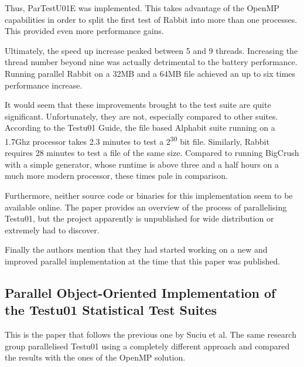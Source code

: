 Thus, ParTestU01E was implemented. This takes advantage of the OpenMP capabilities in order to split the first test of Rabbit into more than one processes. This provided even more performance gains.

Ultimately, the speed up increase peaked between 5 and 9 threads. Increasing the thread number beyond nine was actually detrimental to the battery performance. Running parallel Rabbit on a 32MB and a 64MB file achieved an up to six times performance increase.

It would seem that these improvements brought to the test suite are quite significant. Unfortunately, they are not, especially compared to other suites. According to the Testu01 Guide, the file based Alphabit suite running on a 1.7Ghz processor takes 2.3 minutes to test a 2\textsuperscript{30} bit file. Similarly, Rabbit requires 28 minutes to test a file of the same size. Compared to running BigCrush with a simple generator, whose runtime is above three and a half hours on a much more modern processor, these times pale in comparison.

Furthermore, neither source code or binaries for this implementation seem to be available online. The paper provides an overview of the process of parallelising Testu01, but the project apparently is unpublished for wide distribution or extremely had to discover.

Finally the authors mention that they had started working on a new and improved parallel implementation at the time that this paper was published.

\subsection{Parallel Object-Oriented Implementation of the Testu01 Statistical Test Suites}
This is the paper that follows the previous one by Suciu et al. The same research group parallelised Testu01 using a completely different approach and compared the results with the ones of the OpenMP solution.

